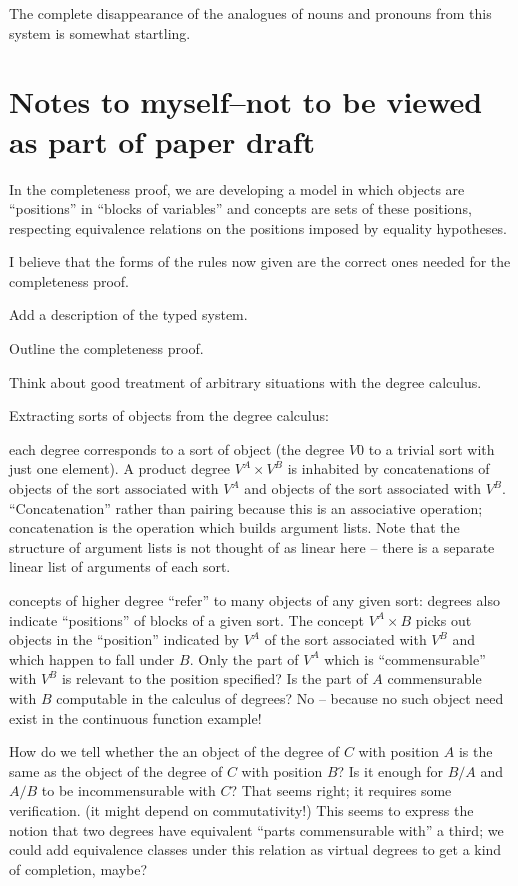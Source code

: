 \documentclass{article}
\begin{document}
The complete disappearance of the analogues of nouns and pronouns from 
this system is somewhat startling.

\section{Notes to myself--not to be viewed as part of paper draft}

In the completeness proof, we are developing a model in which objects
are ``positions'' in ``blocks of variables'' and concepts are sets of
these positions, respecting equivalence relations on the positions imposed
by equality hypotheses.

I believe that the forms of the rules now given are the correct ones
needed for the completeness proof.

Add a description of the typed system.

Outline the completeness proof.

Think about good treatment of arbitrary situations with the degree
calculus.

Extracting sorts of objects from the degree calculus:

each degree corresponds to a sort of object (the degree $V0$ to a
trivial sort with just one element).  A product degree $V^A \times
V^B$ is inhabited by concatenations of objects of the sort associated
with $V^A$ and objects of the sort associated with $V^B$.
``Concatenation'' rather than pairing because this is an associative
operation; concatenation is the operation which builds argument lists.
Note that the structure of argument lists is not thought of as linear
here -- there is a separate linear list of arguments of each sort.

concepts of higher degree ``refer'' to many objects of any given sort:
degrees also indicate ``positions'' of blocks of a given sort.  The
concept $V^A \times B$ picks out objects in the ``position'' indicated
by $V^A$ of the sort associated with $V^B$ and which happen to fall
under $B$.  Only the part of $V^A$ which is ``commensurable'' with
$V^B$ is relevant to the position specified?  Is the part of $A$
commensurable with $B$ computable in the calculus of degrees?  No --
because no such object need exist in the continuous function example!

How do we tell whether the an object of the degree of $C$ with
position $A$ is the same as the object of the degree of $C$ with
position $B$?  Is it enough for $B/A$ and $A/B$ to be incommensurable
with $C$?  That seems right; it requires some verification.  (it might
depend on commutativity!)  This seems to express the notion that two
degrees have equivalent ``parts commensurable with'' a third; we could
add equivalence classes under this relation as virtual degrees to get
a kind of completion, maybe?
\end{document}
